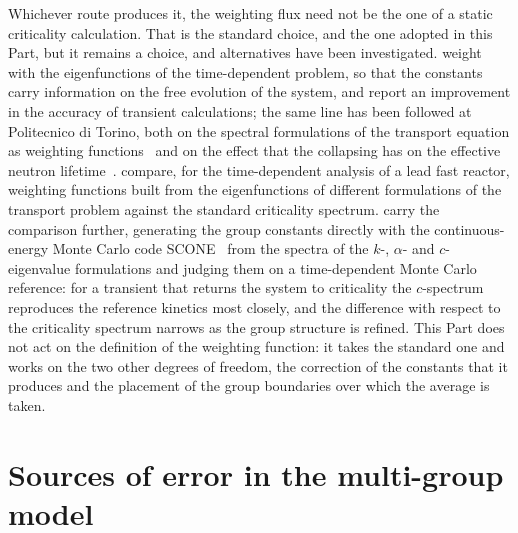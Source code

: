 Whichever route produces it, the weighting flux need not be the one of a static
criticality calculation. That is the standard choice, and the one adopted in this
Part, but it remains a choice, and alternatives have been investigated.
\citet{Dugan2016,Dugan2018} weight with the eigenfunctions of the time-dependent
problem, so that the constants carry information on the free evolution of the
system, and report an improvement in the accuracy of transient calculations; the
same line has been followed at Politecnico di Torino, both on the spectral
formulations of the transport equation as weighting functions~\cite{abrateThesis}
and on the effect that the collapsing has on the effective neutron
lifetime~\cite{collapsing}. \citet{altWeighting} compare, for the
time-dependent analysis of a lead fast reactor, weighting functions built from
the eigenfunctions of different formulations of the transport problem against
the standard criticality spectrum. \citet{eigenSpectra} carry the comparison
further, generating the group constants directly with the continuous-energy
Monte Carlo code SCONE~\cite{scone} from the spectra of the $k$-, $\alpha$- and
$c$-eigenvalue formulations and judging them on a time-dependent Monte Carlo
reference: for a transient that returns the system to criticality the
$c$-spectrum reproduces the reference kinetics most closely, and the difference
with respect to the criticality spectrum narrows as the group structure is
refined.
This Part does not act on the definition of the weighting function: it takes the
standard one and works on the two other degrees of freedom, the correction of the
constants that it produces and the placement of the group boundaries over which
the average is taken.

\section{Sources of error in the multi-group model}\label{mg:sec:errors}

